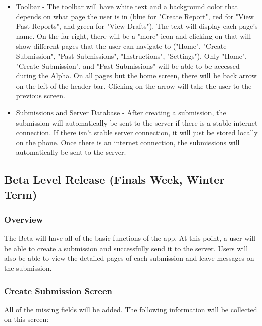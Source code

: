 \documentclass[onecolumn, draftclsnofoot,10pt, compsoc]{IEEEtran}
\begin{document}
\begin{itemize}
\item Toolbar - The toolbar will have white text and a background color that depends on what page the user is in (blue for "Create Report", red for "View Past Reports", and green for "View Drafts"). The text will display each page's name. On the far right, there will be a "more" icon and clicking on that will show different pages that the user can navigate to ("Home", "Create Submission", "Past Submissions", "Instructions", "Settings"). Only "Home", "Create Submission", and "Past Submissions" will be able to be accessed during the Alpha. On all pages but the home screen, there will be back arrow on the left of the header bar. Clicking on the arrow will take the user to the previous screen.

\item Submissions and Server Database - After creating a submission, the submission will automatically be sent to the server if there is a stable internet connection. If there isn't stable server connection, it will just be stored locally on the phone. Once there is an internet connection, the submissions will automatically be sent to the server.

\end{itemize}

\subsection{Beta Level Release (Finals Week, Winter Term)}
\subsubsection{Overview}
The Beta will have all of the basic functions of the app. At this point, a user will be able to create a submission and successfully send it to the server. Users will also be able to view the detailed pages of each submission and leave messages on the submission.

\subsubsection{Create Submission Screen}
All of the missing fields will be added. The following information will be collected on this screen:
\end{document}

